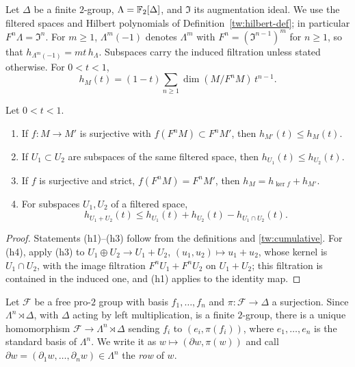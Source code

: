 Let $\Delta$ be a finite $2$-group, $\Lambda=\mathbb F_2[\Delta]$, and
$\mathfrak I$ its augmentation ideal. We use the filtered spaces and Hilbert
polynomials of Definition~\ref{tw:hilbert-def}; in particular
$F^n\Lambda=\mathfrak I^n$. For $m\ge1$, $\Lambda^m(-1)$ denotes $\Lambda^m$
with $F^n=(\mathfrak I^{n-1})^m$ for $n\ge1$, so that
$h_{\Lambda^m(-1)}=mt\,h_\Lambda$. Subspaces carry the induced filtration
unless stated otherwise. For $0<t<1$,
\begin{equation}\label{tw:cumulative}
 h_M(t)=(1-t)\sum_{n\ge1}\dim(M/F^nM)\,t^{n-1}.
\end{equation}

\begin{lemma}\label{tw:hilbert-properties}
Let $0<t<1$.
\begin{enumerate}
\item[(h1)] If $f\colon M\to M'$ is surjective with
 $f(F^nM)\subset F^nM'$, then $h_{M'}(t)\le h_M(t)$.
\item[(h2)] If $U_1\subset U_2$ are subspaces of the same filtered space,
 then $h_{U_1}(t)\le h_{U_2}(t)$.
\item[(h3)] If $f$ is surjective and strict, $f(F^nM)=F^nM'$, then
 $h_M=h_{\ker f}+h_{M'}$.
\item[(h4)] For subspaces $U_1,U_2$ of a filtered space,
 \begin{equation}\label{tw:filtered-sum}
  h_{U_1+U_2}(t)\le h_{U_1}(t)+h_{U_2}(t)-h_{U_1\cap U_2}(t).
 \end{equation}
\end{enumerate}
\end{lemma}

\begin{proof}
Statements (h1)--(h3) follow from the definitions and \eqref{tw:cumulative}.
For (h4), apply (h3) to $U_1\oplus U_2\to U_1+U_2$, $(u_1,u_2)\mapsto u_1+u_2$,
whose kernel is $U_1\cap U_2$, with the image filtration $F^nU_1+F^nU_2$ on
$U_1+U_2$; this filtration is contained in the induced one, and (h1) applies
to the identity map.
\end{proof}

\begin{definition}\label{tw:row}
Let $\mathcal F$ be a free pro-$2$ group with basis $f_1,\dots,f_n$ and
$\pi\colon\mathcal F\to\Delta$ a surjection. Since $\Lambda^n\rtimes\Delta$,
with $\Delta$ acting by left multiplication, is a finite $2$-group, there is
a unique homomorphism $\mathcal F\to\Lambda^n\rtimes\Delta$ sending $f_i$ to
$(e_i,\pi(f_i))$, where $e_1,\dots,e_n$ is the standard basis of $\Lambda^n$.
We write it as $w\mapsto(\partial w,\pi(w))$ and call
$\partial w=(\partial_1w,\dots,\partial_nw)\in\Lambda^n$ the \emph{row} of $w$.
\end{definition}

